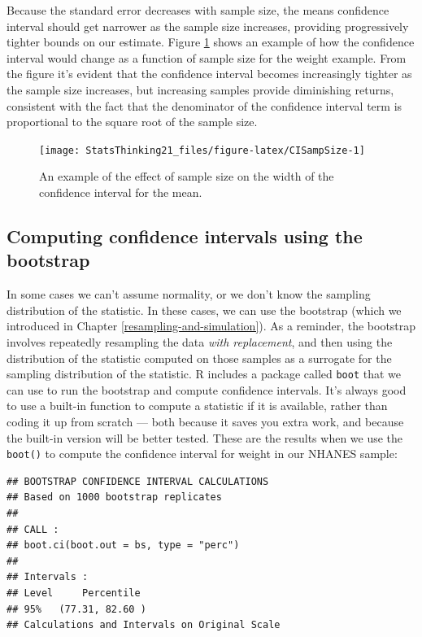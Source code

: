 \documentclass[12pt,]{book}
\begin{document}
Because the standard error decreases with sample size, the means confidence interval should get narrower as the sample size increases, providing progressively tighter bounds on our estimate. Figure \ref{fig:CISampSize} shows an example of how the confidence interval would change as a function of sample size for the weight example. From the figure it's evident that the confidence interval becomes increasingly tighter as the sample size increases, but increasing samples provide diminishing returns, consistent with the fact that the denominator of the confidence interval term is proportional to the square root of the sample size.

\begin{figure}
\texttt{[image: StatsThinking21\_files/figure-latex/CISampSize-1]} \caption{An example of the effect of sample size on the width of the confidence interval for the mean.}\label{fig:CISampSize}
\end{figure}

\hypertarget{computing-confidence-intervals-using-the-bootstrap}{%
\subsection{Computing confidence intervals using the bootstrap}\label{computing-confidence-intervals-using-the-bootstrap}}

In some cases we can't assume normality, or we don't know the sampling distribution of the statistic. In these cases, we can use the bootstrap (which we introduced in Chapter \ref{resampling-and-simulation}). As a reminder, the bootstrap involves repeatedly resampling the data \emph{with replacement}, and then using the distribution of the statistic computed on those samples as a surrogate for the sampling distribution of the statistic.
R includes a package called \texttt{boot} that we can use to run the bootstrap and compute confidence intervals. It's always good to use a built-in function to compute a statistic if it is available, rather than coding it up from scratch --- both because it saves you extra work, and because the built-in version will be better tested. These are the results when we use the \texttt{boot()} to compute the confidence interval for weight in our NHANES sample:

\begin{verbatim}
## BOOTSTRAP CONFIDENCE INTERVAL CALCULATIONS
## Based on 1000 bootstrap replicates
## 
## CALL : 
## boot.ci(boot.out = bs, type = "perc")
## 
## Intervals : 
## Level     Percentile     
## 95%   (77.31, 82.60 )  
## Calculations and Intervals on Original Scale
\end{verbatim}
\end{document}
